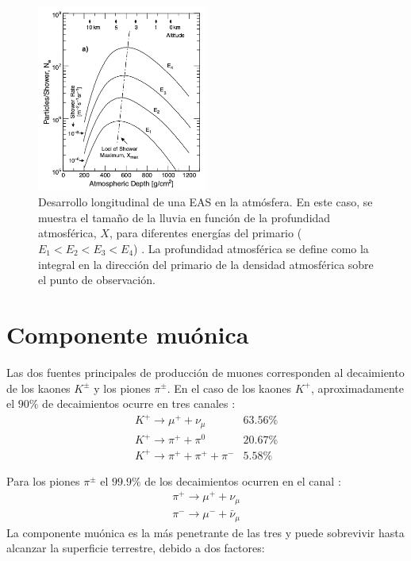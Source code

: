 \begin{figure}[h!]
\begin{center}
\includegraphics[width=0.5\textwidth]{Figures/EAS}
\caption[Desarrollo longitudinal de una EAS en la atmósfera]{Desarrollo longitudinal de una EAS en la atmósfera. En este caso, se muestra el tamaño de la lluvia en función de la profundidad atmosférica, $X$, para diferentes energías del primario ($E_1<E_2<E_3<E_4$) \cite{Grieder2010}. La profundidad atmosférica se define como la integral en la dirección del primario de la densidad atmosférica sobre el punto de observación.}
\label{EAS}
\end{center}
\end{figure}

\section{Componente muónica}

Las dos fuentes principales de producción de muones corresponden al decaimiento de los kaones $K^{\pm}$ y los piones $\pi^{\pm}$. En el caso de los kaones $K^+$, aproximadamente el $90\%$ de decaimientos ocurre en tres canales \cite{Olive2014}:
\begin{equation}
\begin{array}{ll}
K^+ \rightarrow \mu^+ + \nu_{\mu} & 63.56\% \\
K^+ \rightarrow \pi^+ + \pi^0 & 20.67\% \\
K^+ \rightarrow \pi^+ + \pi^+ + \pi^- &5.58\%
\end{array}
\end{equation}

Para los piones $\pi^\pm$ el $99.9\%$ de los decaimientos ocurren en el canal \cite{Olive2014}:
\begin{eqnarray}
\pi^+ \rightarrow \mu^+ + \nu_{\mu}\\
\pi^- \rightarrow \mu^- + \bar{\nu}_{\mu}
\end{eqnarray}
La componente muónica es la más penetrante de las tres y puede sobrevivir hasta alcanzar la superficie terrestre, debido a dos factores:

